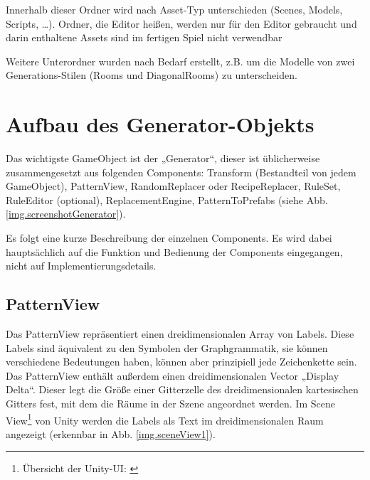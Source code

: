 Innerhalb dieser Ordner wird nach Asset-Typ unterschieden (Scenes, Models, Scripts, \dots). Ordner, die Editor heißen, werden nur für den Editor gebraucht und darin enthaltene Assets sind im fertigen Spiel nicht verwendbar \cite[Seite: SpecialFolders]{unityManual}

Weitere Unterordner wurden nach Bedarf erstellt, z.B. um die Modelle von zwei Generations-Stilen (Rooms und DiagonalRooms) zu unterscheiden.

\section{Aufbau des Generator-Objekts}

Das wichtigste GameObject ist der „Generator“, dieser ist üblicherweise zusammengesetzt aus folgenden Components: 
Transform (Bestandteil von jedem GameObject), PatternView, RandomReplacer oder RecipeReplacer, RuleSet, RuleEditor (optional), ReplacementEngine, PatternToPrefabs (siehe Abb. \ref{img.screenshotGenerator}). 


Es folgt eine kurze Beschreibung der einzelnen Components. Es wird dabei hauptsächlich auf die Funktion und Bedienung der Components eingegangen, nicht auf Implementierungsdetails.

\subsection{PatternView}\label{ss.patternView}

Das PatternView repräsentiert einen dreidimensionalen Array von Labels. Diese Labels sind äquivalent zu den Symbolen der Graphgrammatik, sie können verschiedene Bedeutungen haben, können aber prinzipiell jede Zeichenkette sein. Das PatternView enthält außerdem einen dreidimensionalen Vector „Display Delta“. Dieser legt die Größe einer Gitterzelle des dreidimensionalen kartesischen Gitters fest, mit dem die Räume in der Szene angeordnet werden. Im Scene View\footnote{Übersicht der Unity-UI: \cite[Seite: LearningtheInterface]{unityManual}} von Unity werden die Labels als Text im dreidimensionalen Raum angezeigt (erkennbar in Abb. \ref{img.sceneView1}).


